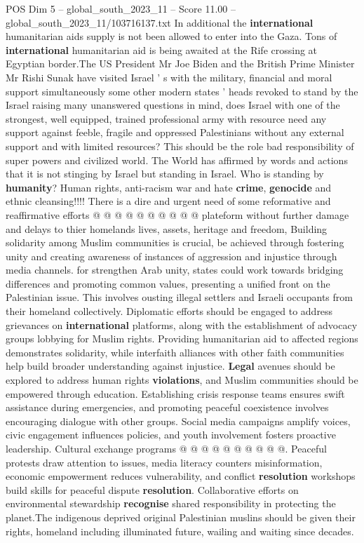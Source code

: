 \begin{textsample}{POS Dim 5 – global\_south\_2023\_11 – Score 11.00 – global\_south\_2023\_11/103716137.txt}
In additional the \textbf{international} humanitarian aids supply is not been allowed to enter into the Gaza.
Tons of \textbf{international} humanitarian aid is being awaited at the Rife crossing at Egyptian border.The US President Mr Joe Biden and the British Prime Minister Mr Rishi Sunak have visited Israel ' s with the military, financial and moral support simultaneously some other modern states ' heads revoked to stand by the Israel raising many unanswered questions in mind, does Israel with one of the strongest, well equipped, trained professional army with resource need any support against feeble, fragile and oppressed Palestinians without any external support and with limited resources?
This should be the role bad responsibility of super powers and civilized world.
The World has affirmed by words and actions that it is not stinging by Israel but standing in Israel.
Who is standing by \textbf{humanity}?
Human rights, anti-racism war and hate \textbf{crime}, \textbf{genocide} and ethnic cleansing!!!!
There is a dire and urgent need of some reformative and reaffirmative efforts @ @ @ @ @ @ @ @ @ @ plateform without further damage and delays to thier homelands lives, assets, heritage and freedom, Building solidarity among Muslim communities is crucial, be achieved through fostering unity and creating awareness of instances of aggression and injustice through media channels. for strengthen Arab unity, states could work towards bridging differences and promoting common values, presenting a unified front on the Palestinian issue.
This involves ousting illegal settlers and Israeli occupants from their homeland collectively.
Diplomatic efforts should be engaged to address grievances on \textbf{international} platforms, along with the establishment of advocacy groups lobbying for Muslim rights.
Providing humanitarian aid to affected regions demonstrates solidarity, while interfaith alliances with other faith communities help build broader understanding against injustice. \textbf{Legal} avenues should be explored to address human rights \textbf{violations}, and Muslim communities should be empowered through education.
Establishing crisis response teams ensures swift assistance during emergencies, and promoting peaceful coexistence involves encouraging dialogue with other groups.
Social media campaigns amplify voices, civic engagement influences policies, and youth involvement fosters proactive leadership.
Cultural exchange programs @ @ @ @ @ @ @ @ @ @.
Peaceful protests draw attention to issues, media literacy counters misinformation, economic empowerment reduces vulnerability, and conflict \textbf{resolution} workshops build skills for peaceful dispute \textbf{resolution}.
Collaborative efforts on environmental stewardship \textbf{recognise} shared responsibility in protecting the planet.The indigenous deprived original Palestinian muslins should be given their rights, homeland including illuminated future, wailing and waiting since decades.

\end{textsample}
